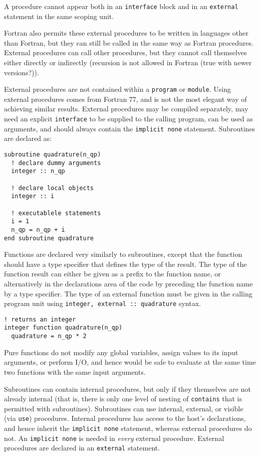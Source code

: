 \documentclass[10pt]{article}
\begin{document}
A procedure cannot appear both in an {\tt interface} block and in an {\tt external} statement in the same scoping unit.

Fortran also permits these external procedures to be written in languages other than Fortran, but they can still be called in the same way as Fortran procedures. External procedures can call other procedures, but they cannot call themselves either directly or indirectly (recursion is not allowed in Fortran (true with newer versions?)).

External procedures are not contained within a {\tt program} or {\tt module}. Using external procedures comes from Fortran 77, and is not the most elegant way of achieving similar results. External procedures may be compiled separately, may need an explicit {\tt interface} to be supplied to the calling program, can be used as arguments, and should always contain the {\tt implicit none} statement. Subroutines are declared as:

\begin{lstlisting}
subroutine quadrature(n_qp)
  ! declare dummy arguments
  integer :: n_qp
  
  ! declare local objects
  integer :: i
  
  ! executablele statements
  i = 1
  n_qp = n_qp + i
end subroutine quadrature
\end{lstlisting}

Functions are declared very similarly to subroutines, except that the function should have a type specifier that defines the type of the result. The type of the function result can either be given as a prefix to the function name, or alternatively in the declarations area of the code by preceding the function name by a type specifier. The type of an external function must be given in the calling program unit using {\tt integer, external :: quadrature} syntax. 

\begin{lstlisting}
! returns an integer
integer function quadrature(n_qp)
  quadrature = n_qp * 2
\end{lstlisting}

Pure functions do not modify any global variables, assign values to its input arguments, or perform I/O, and hence would be safe to evaluate at the same time two functions with the same input arguments. 

Subroutines can contain internal procedures, but only if they themselves are not already internal (that is, there is only one level of nesting of {\tt contains} that is permitted with subroutines). Subroutines can use internal, external, or visible (via {\tt use}) procedures. Internal procedures has access to the host's declarations, and hence inherit the {\tt implicit none} statement, whereas external procedures do not. An {\tt implicit none} is needed in {\it every} external procedure. External procedures are declared in an {\tt external} statement. 
\end{document}
